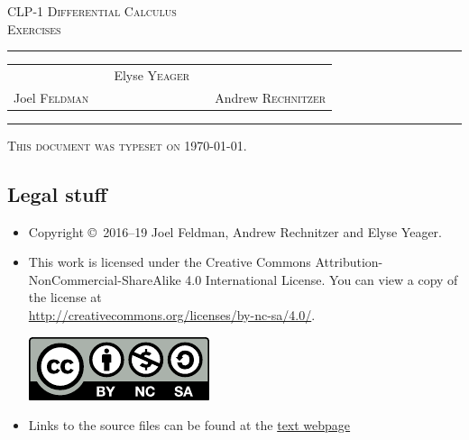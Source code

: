 \documentclass[12pt,letterpaper]{book}
\begin{document}
\setcounter{page}{0}

\begin{titlepage}
\begin{center}
\textsc{\LARGE
CLP-1 Differential Calculus\\[2ex]
Exercises
}\\[2ex]

\vspace{5ex}
\hrule
\vspace{5ex}

\begin{tabular}{lcccr}
&& \large Elyse \textsc{Yeager} \\[3ex]
 Joel \textsc{Feldman}
&\quad & &\quad&
Andrew \textsc{Rechnitzer}
\end{tabular}

\end{center}
\vspace{2ex}
\hrule

\vfill
\textsc{This document was typeset on \today.}
\end{titlepage}

\subsection*{Legal stuff}
\begin{itemize}
 \item Copyright \copyright\ 2016--19 Joel Feldman, Andrew Rechnitzer and Elyse Yeager.

\item This work is licensed under the
Creative Commons Attribution-NonCommercial-ShareAlike 4.0 International
License. You can view a copy of the license at \\
\url{http://creativecommons.org/licenses/by-nc-sa/4.0/}.
\begin{center}
 \includegraphics{by-nc-sa.pdf}
\end{center}


\item Links to the source files can be found at the \href{http://www.math.ubc.ca/~CLP/index.html}{text webpage}
\end{itemize}


\frontmatter
\end{document}
